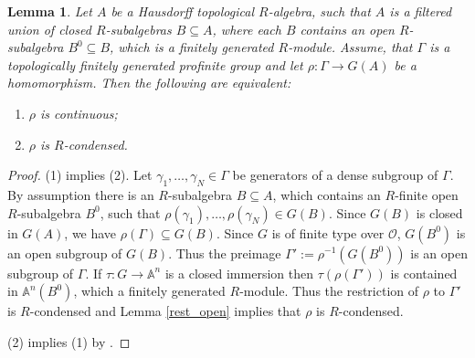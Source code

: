 \documentclass{amsart}
\newtheorem{lem}[prop]{Lemma}
\theoremstyle{definition}
\theoremstyle{remark}
\newcommand{\OO}{\mathcal O}
\begin{document}
\begin{lem}\label{cont_vs_cond}
    Let $A$ be a Hausdorff topological $R$-algebra, such that $A$ is a filtered union of closed $R$-subalgebras $B \subseteq A$, where each $B$ contains an open $R$-subalgebra $B^0 \subseteq B$, which is a finitely generated $R$-module. Assume, that $\Gamma$ is a topologically finitely generated profinite group and let $\rho : \Gamma \to G(A)$ be a homomorphism. Then the following are equivalent:
    \begin{enumerate}
        \item $\rho$ is continuous;
        \item $\rho$ is $R$-condensed.
    \end{enumerate}
\end{lem}

\begin{proof} 
    (1) implies (2). Let $\gamma_1, \dots, \gamma_N \in \Gamma$ be generators of a dense subgroup of $\Gamma$.
    By assumption there is an $R$-subalgebra $B \subseteq A$, which contains an $R$-finite open $R$-subalgebra $B^0$, such that $\rho(\gamma_1), \dots, \rho(\gamma_N) \in G(B)$.
    Since $G(B)$ is closed in $G(A)$, we have $\rho(\Gamma) \subseteq G(B)$. 
    Since $G$ is of finite type over $\OO$, $G(B^0)$ is an open subgroup of $G(B)$. Thus  the preimage $\Gamma':=\rho^{-1}(G(B^0))$ is an open subgroup of $\Gamma$. If $\tau: G\rightarrow 
    \mathbb A^n$ is a closed immersion then $\tau(\rho(\Gamma'))$ is contained in $\mathbb A^n(B^0)$, which a finitely generated $R$-module. Thus the restriction of $\rho$ to $\Gamma'$ 
    is $R$-condensed and Lemma \ref{rest_open} implies that $\rho$ is $R$-condensed. 


    (2) implies (1) by .
\end{proof}
\end{document}
